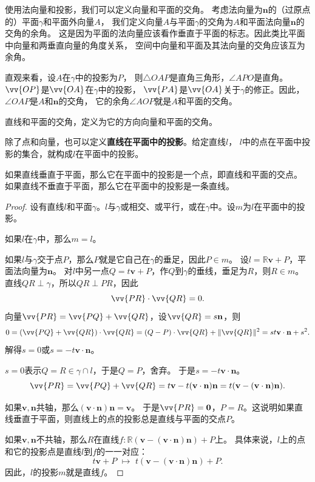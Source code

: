 \documentclass[12pt,UTF8,fontset=none]{ctexbook}
\begin{document}
使用法向量和投影，我们可以定义向量和平面的交角。
考虑法向量为$\mathbf{n}$的（过原点的）平面$\gamma$和平面外向量$A$，
我们定义向量$A$与平面$\gamma$的交角为$A$和平面法向量$\mathbf{n}$的交角的余角。
这是因为平面的法向量应该看作垂直于平面的标志。因此类比平面中向量和两垂直向量的角度关系，
空间中向量和平面及其法向量的交角应该互为余角。

直观来看，设$A$在$\gamma$中的投影为$P$，
则$\triangle OAP$是直角三角形，$\angle APO$是直角。$\vv{OP}$是$\vv{OA}$在$\gamma$中的投影，
$\vv{PA}$是$\vv{OA}$关于$\gamma$的修正。因此，$\angle OAP$是$A$和$\mathbf{n}$的交角，
它的余角$\angle AOP$就是$A$和平面的交角。

直线和平面的交角，定义为它的方向向量和平面的交角。

除了点和向量，也可以定义\textbf{直线在平面中的投影}。给定直线$l$，
$l$中的点在平面中投影的集合，就构成$l$在平面中的投影。
\begin{tm}\label{tm:1-3-55}
    如果直线垂直于平面，那么它在平面中的投影是一个点，即直线和平面的交点。
    如果直线不垂直于平面，那么它在平面中的投影是一条直线。    
\end{tm}
\begin{proof}
    设有直线$l$和平面$\gamma$。$l$与$\gamma$或相交、或平行，或在$\gamma$中。设$m$为$l$在平面中的投影。

    如果$l$在$\gamma$中，那么$m=l$。

    如果$l$与$\gamma$交于点$P$，那么$P$就是它自己在$\gamma$的垂足，因此$P\in m$。
    设$l=\mathbb{R}\mathbf{v}+P$，平面法向量为$\mathbf{n}$。
    对$l$中另一点$Q = t\mathbf{v}+P$，作$Q$到$\gamma$的垂线，垂足为$R$，则$R\in m$。
    直线$QR\perp\gamma$，所以$QR\perp PR$，因此
    $$ \vv{PR}\cdot\vv{QR} = 0.$$
    向量$\vv{PR} = \vv{PQ} + \vv{QR}$，设$\vv{QR} = s\mathbf{n}$，则
    $$ 0 = (\vv{PQ} + \vv{QR})\cdot\vv{QR} = (Q - P) \cdot\vv{QR} + \|\vv{QR}\|^2 = st\mathbf{v}\cdot\mathbf{n} + s^2. $$
    解得$s=0$或$s = -t\mathbf{v}\cdot\mathbf{n}$。
    
    $s=0$表示$Q=R\in \gamma\cap l$，于是$Q=P$，舍弃。
    于是$s = -t\mathbf{v}\cdot\mathbf{n}$。
    $$\vv{PR} = \vv{PQ} + \vv{QR} = t\mathbf{v} -t(\mathbf{v}\cdot\mathbf{n})\mathbf{n} = t(\mathbf{v} - (\mathbf{v}\cdot\mathbf{n})\mathbf{n}). $$
    
    如果$\mathbf{v}, \mathbf{n}$共轴，那么$(\mathbf{v}\cdot\mathbf{n})\mathbf{n} = \mathbf{v}$。
    于是$\vv{PR} = \mathbf{0}$，$P = R$。这说明如果直线垂直于平面，则直线上的点的投影总是直线与平面的交点$P$。

    如果$\mathbf{v},\mathbf{n}$不共轴，那么$R$在直线$f:\mathbb{R}(\mathbf{v} - (\mathbf{v}\cdot\mathbf{n})\mathbf{n}) + P$上。
    具体来说，$l$上的点和它的投影点是直线$l$到$f$的一一对应：
    $$ t\mathbf{v}+P \,\,\mapsto \,\, t(\mathbf{v} - (\mathbf{v}\cdot\mathbf{n})\mathbf{n}) + P.$$
    因此，$l$的投影$m$就是直线$f$。
    
\end{proof}
\end{document}
